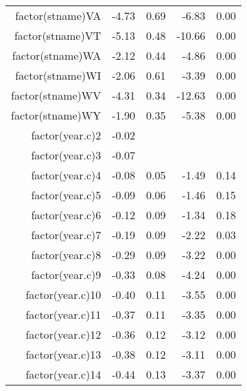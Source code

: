 \begin{table}[ht]
\begin{tabular}{rrrrr}
  factor(stname)VA & -4.73 & 0.69 & -6.83 & 0.00 \\ 
  factor(stname)VT & -5.13 & 0.48 & -10.66 & 0.00 \\ 
  factor(stname)WA & -2.12 & 0.44 & -4.86 & 0.00 \\ 
  factor(stname)WI & -2.06 & 0.61 & -3.39 & 0.00 \\ 
  factor(stname)WV & -4.31 & 0.34 & -12.63 & 0.00 \\ 
  factor(stname)WY & -1.90 & 0.35 & -5.38 & 0.00 \\ 
  factor(year.c)2 & -0.02 &  &  &  \\ 
  factor(year.c)3 & -0.07 &  &  &  \\ 
  factor(year.c)4 & -0.08 & 0.05 & -1.49 & 0.14 \\ 
  factor(year.c)5 & -0.09 & 0.06 & -1.46 & 0.15 \\ 
  factor(year.c)6 & -0.12 & 0.09 & -1.34 & 0.18 \\ 
  factor(year.c)7 & -0.19 & 0.09 & -2.22 & 0.03 \\ 
  factor(year.c)8 & -0.29 & 0.09 & -3.22 & 0.00 \\ 
  factor(year.c)9 & -0.33 & 0.08 & -4.24 & 0.00 \\ 
  factor(year.c)10 & -0.40 & 0.11 & -3.55 & 0.00 \\ 
  factor(year.c)11 & -0.37 & 0.11 & -3.35 & 0.00 \\ 
  factor(year.c)12 & -0.36 & 0.12 & -3.12 & 0.00 \\ 
  factor(year.c)13 & -0.38 & 0.12 & -3.11 & 0.00 \\ 
  factor(year.c)14 & -0.44 & 0.13 & -3.37 & 0.00 \\ 
   \hline
\end{tabular}
\end{table}
